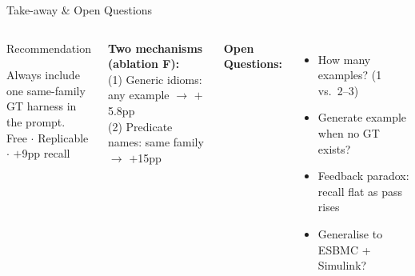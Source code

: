\documentclass[aspectratio=169]{beamer}
\begin{document}
\begin{frame}{Take-away \& Open Questions}

\begin{columns}[T]


\begin{block}{\centering Recommendation}
\begin{center}
{\normalsize Always include one same-family\\[3pt]
GT harness in the prompt.}\\[6pt]
{\small Free $\cdot$ Replicable $\cdot$ $+$9pp recall}
\end{center}
\end{block}

\medskip
{\small
\textbf{Two mechanisms (ablation F):}\\[4pt]
\quad \textcolor{myblue}{(1) Generic idioms:} any example $\rightarrow$ $+$5.8pp\\
\quad \textcolor{mygreen}{(2) Predicate names:} same family $\rightarrow$ $+$15pp
}


\textbf{Open Questions:}
\begin{itemize}\small
  \item How many examples? (1 vs.\ 2--3)
  \item Generate example when no GT exists?
  \item Feedback paradox: recall flat as pass rises
  \item Generalise to ESBMC + Simulink?
\end{itemize}


\end{columns}

\end{frame}
\end{document}
